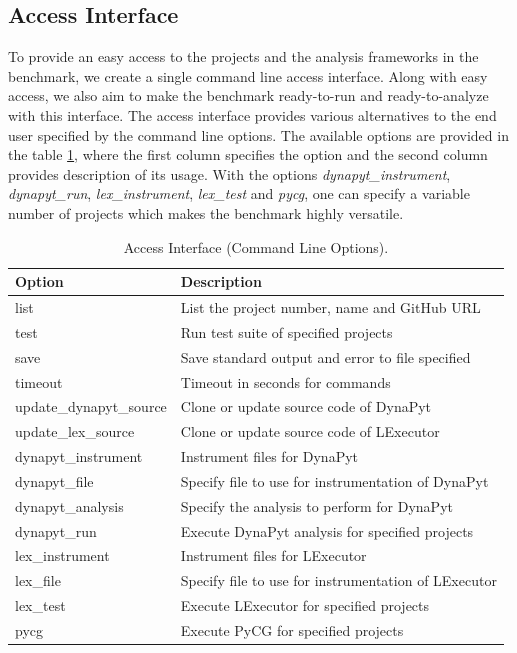 \subsection{Access Interface}
\label{approach:access interface}
To provide an easy access to the projects and the analysis frameworks in the benchmark, we create a single command line access interface.
Along with easy access, we also aim to make the benchmark ready-to-run and ready-to-analyze with this interface. 
The access interface provides various alternatives to the end user specified by the command line options.
The available options are provided in the table \ref{table:access interface options}, where the first column specifies the option and the second column provides description of its usage.
With the options \textit{dynapyt\_instrument}, \textit{dynapyt\_run}, \textit{lex\_instrument}, \textit{lex\_test} and \textit{pycg}, one can specify a variable number of projects which makes the benchmark highly versatile.

\begin{table}[ht]
    \centering
    \begin{tabular}{ll}
    \hline
    \textbf{Option} & \textbf{Description}\\
    \hline
    list    & List the project number, name and GitHub URL\\
    test    & Run test suite of specified projects\\
    save    & Save standard output and error to file specified\\
    timeout & Timeout in seconds for commands\\
    update\_dynapyt\_source   & Clone or update source code of DynaPyt\\
    update\_lex\_source   & Clone or update source code of LExecutor\\
    dynapyt\_instrument  & Instrument files for DynaPyt\\
    dynapyt\_file    & Specify file to use for instrumentation of DynaPyt\\
    dynapyt\_analysis    & Specify the analysis to perform for DynaPyt\\
    dynapyt\_run & Execute DynaPyt analysis for specified projects\\
    lex\_instrument  & Instrument files for LExecutor\\
    lex\_file    & Specify file to use for instrumentation of LExecutor\\
    lex\_test    & Execute LExecutor for specified projects\\
    pycg    & Execute PyCG for specified projects\\
    \hline
    \end{tabular}
    \caption{Access Interface (Command Line Options).}
    \label{table:access interface options}
\end{table}


